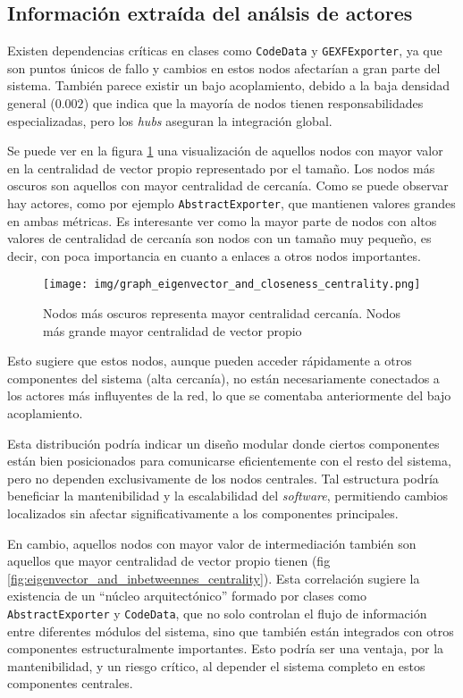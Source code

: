 \documentclass[12pt,letterpaper]{article}
\begin{document}
\subsection{Información extraída del análsis de actores}
Existen dependencias críticas en clases como \texttt{CodeData} y \texttt{GEXFExporter}, ya que son puntos únicos de fallo y cambios en estos nodos afectarían a gran parte del sistema. También parece existir un bajo acoplamiento, debido a la baja densidad general ($0.002$) que indica que la mayoría de nodos tienen responsabilidades especializadas, pero los \textit{hubs} aseguran la integración global.

Se puede ver en la figura \ref{fig:eigenvector_and_closeness_centrality} una visualización de aquellos nodos con mayor valor en la centralidad de vector propio representado por el tamaño. Los nodos más oscuros son aquellos con mayor centralidad de cercanía. Como se puede observar hay actores, como por ejemplo \texttt{AbstractExporter}, que mantienen valores grandes en ambas métricas. Es interesante ver como la mayor parte de nodos con altos valores de centralidad de cercanía son nodos con un tamaño muy pequeño, es decir, con poca importancia en cuanto a enlaces a otros nodos importantes.

\begin{figure}[htp]
    \centering
    \texttt{[image: img/graph\_eigenvector\_and\_closeness\_centrality.png]}
    \caption{Nodos más oscuros representa mayor centralidad cercanía. Nodos más grande mayor centralidad de vector propio}
    \label{fig:eigenvector_and_closeness_centrality}
\end{figure}

Esto sugiere que estos nodos, aunque pueden acceder rápidamente a otros componentes del sistema (alta cercanía), no están necesariamente conectados a los actores más influyentes de la red, lo que se comentaba anteriormente del bajo acoplamiento.

Esta distribución podría indicar un diseño modular donde ciertos componentes están bien posicionados para comunicarse eficientemente con el resto del sistema, pero no dependen exclusivamente de los nodos centrales. Tal estructura podría beneficiar la mantenibilidad y la escalabilidad del \textit{software}, permitiendo cambios localizados sin afectar significativamente a los componentes principales.

En cambio, aquellos nodos con mayor valor de intermediación también son aquellos que mayor centralidad de vector propio tienen (fig \ref{fig:eigenvector_and_inbetweennes_centrality}). Esta correlación sugiere la existencia de un ``núcleo arquitectónico'' formado por clases como \texttt{AbstractExporter} y \texttt{CodeData}, que no solo controlan el flujo de información entre diferentes módulos del sistema, sino que también están integrados con otros componentes estructuralmente importantes. Esto podría ser una ventaja, por la mantenibilidad, y un riesgo crítico, al depender el sistema completo en estos componentes centrales.
\end{document}
